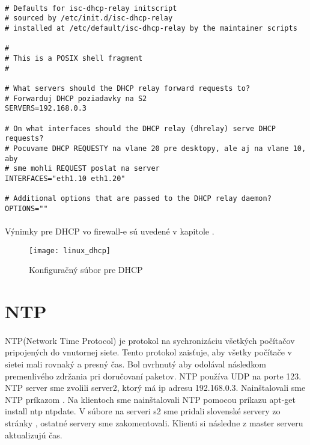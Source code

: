 \noindent
{\selectfont

\begin{small}

\begin{verbatim}

# Defaults for isc-dhcp-relay initscript
# sourced by /etc/init.d/isc-dhcp-relay
# installed at /etc/default/isc-dhcp-relay by the maintainer scripts

#
# This is a POSIX shell fragment
#

# What servers should the DHCP relay forward requests to?
# Forwarduj DHCP poziadavky na S2
SERVERS=192.168.0.3

# On what interfaces should the DHCP relay (dhrelay) serve DHCP requests?
# Pocuvame DHCP REQUESTY na vlane 20 pre desktopy, ale aj na vlane 10, aby 
# sme mohli REQUEST poslat na server
INTERFACES="eth1.10 eth1.20"

# Additional options that are passed to the DHCP relay daemon?
OPTIONS=""

\end{verbatim}

\end{small}

}

\paragraph{}
Výnimky pre DHCP vo firewall-e sú uvedené v kapitole .

\begin{figure}[!htb]
\centering
\texttt{[image: linux\_dhcp]}
\caption{Konfiguračný súbor pre DHCP}
\label{fig:dhcp_config}
\end{figure}

\section{NTP}
\paragraph{}
NTP(Network Time Protocol) je protokol na sychronizáciu všetkých počítačov pripojených do vnutornej siete. Tento protokol zaisťuje, aby všetky počítače v sietei mali rovnaký a presný čas. Bol nvrhnutý aby odolával následkom premenlivého zdržania pri doručovaní paketov. NTP používa UDP na porte 123. NTP server sme zvolili server2, ktorý má ip adresu 192.168.0.3. Nainštalovali sme NTP príkazom . Na klientoch sme nainštalovali NTP pomocou príkazu apt-get install ntp ntpdate. V súbore na serveri s2  sme pridali slovenské servery zo stránky , ostatné servery sme zakomentovali. Klienti si následne z master serveru aktualizujú čas.
